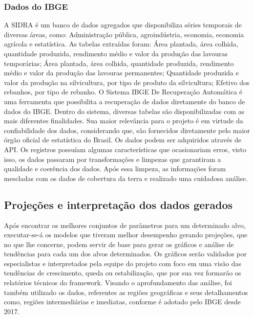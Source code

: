 \subsubsection{Dados do IBGE}

A SIDRA é um banco de dados agregados que disponibiliza séries temporais de diversas áreas, como: Administração pública, agroindústria, economia, economia agrícola e estatística. As tabelas extraídas foram: Área plantada, área colhida, quantidade produzida, rendimento médio e valor da produção das lavouras temporárias; Área plantada, área colhida, quantidade produzida, rendimento médio e valor da produção das lavouras permanentes; Quantidade produzida e valor da produção na silvicultura, por tipo de produto da silvicultura; Efetivo dos rebanhos, por tipo de rebanho. 
O Sistema IBGE De Recuperação Automática é uma ferramenta que possibilita a recuperação de dados diretamente do banco de dados do IBGE. Dentro do sistema, diversas tabelas são disponibilizadas com as mais diferentes finalidades. Sua maior relevância para o projeto é em virtude da confiabilidade dos dados, considerando que, são fornecidos diretamente pelo maior órgão oficial de estatística do Brasil.
Os dados podem ser adquiridos através de API. Os registros possuíam algumas características que ocasionariam erros, visto isso, os dados passaram por transformações e limpezas que garantiram a qualidade e coerência dos dados. Após essa limpeza, as informações foram mescladas com os dados de cobertura da terra e realizado uma cuidadosa análise. 

\subsection{Projeções e interpretação dos dados gerados}

Após encontrar os melhores conjuntos de parâmetros para um determinado alvo, executar-se-á os modelos que tiveram melhor desempenho gerando
projeções, que no que lhe concerne, podem servir de base para gerar os gráficos e análise de tendências para cada um dos alvos determinados.
Os gráficos serão validados por especialistas e interpretados pela equipe do projeto com foco em uma visão das tendências de crescimento, queda ou
estabilização, que por sua vez formarão os relatórios técnicos do framework. Visando o aprofundamento das análise, foi também utilizado os dados, referentes as regiões geográficas e seus detalhamentos como, regiões intermediárias e imediatas, conforme é adotado pelo IBGE desde 2017. 

